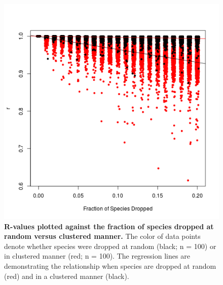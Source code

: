 \documentclass[12pt,english]{article}
\begin{document}
\begin{figure}[!ht]
  \center
  \includegraphics[width=\textwidth]{randomVsCluster.png}
  \caption{\textbf{R-values plotted against the fraction of species 
  dropped at random versus clustered manner.} The color of data points denote 
  whether species were dropped at random (black; n = 100) or in clustered manner 
  (red; n = 100). The regression lines are demonstrating the relationship when 
  species are dropped at random (red) and in a clustered manner (black).}
  \label{randomVsClustered}
\end{figure}
\end{document}
